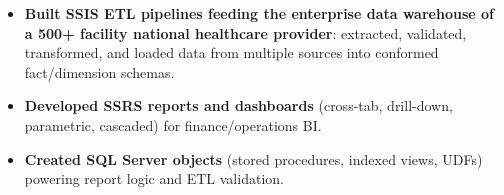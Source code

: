 \documentclass{resume}
\begin{document}
\begin{itemize}
  \item \textbf{Built SSIS ETL pipelines feeding the enterprise data warehouse of a 500+ facility national healthcare provider}: extracted, validated, transformed, and loaded data from multiple sources into conformed fact/dimension schemas.
  \item \textbf{Developed SSRS reports and dashboards} (cross-tab, drill-down, parametric, cascaded) for finance/operations BI.
  \item \textbf{Created SQL Server objects} (stored procedures, indexed views, UDFs) powering report logic and ETL validation.
\end{itemize}

\end{document}
